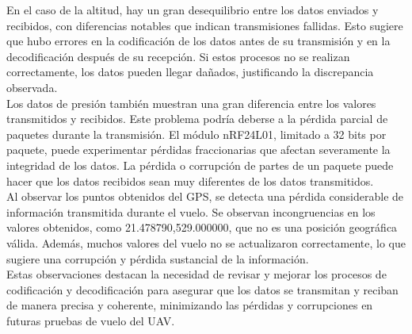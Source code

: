 En el caso de la altitud, hay un gran desequilibrio entre los datos enviados y recibidos, con diferencias notables que indican transmisiones fallidas. Esto sugiere que hubo errores en la codificación de los datos antes de su transmisión y en la decodificación después de su recepción. Si estos procesos no se realizan correctamente, los datos pueden llegar dañados, justificando la discrepancia observada.\\

Los datos de presión también muestran una gran diferencia entre los valores transmitidos y recibidos. Este problema podría deberse a la pérdida parcial de paquetes durante la transmisión. El módulo nRF24L01, limitado a 32 bits por paquete, puede experimentar pérdidas fraccionarias que afectan severamente la integridad de los datos. La pérdida o corrupción de partes de un paquete puede hacer que los datos recibidos sean muy diferentes de los datos transmitidos.\\

Al observar los puntos obtenidos del GPS, se detecta una pérdida considerable de información transmitida durante el vuelo. Se observan incongruencias en los valores obtenidos, como 21.478790,529.000000, que no es una posición geográfica válida. Además, muchos valores del vuelo no se actualizaron correctamente, lo que sugiere una corrupción y pérdida sustancial de la información.\\

Estas observaciones destacan la necesidad de revisar y mejorar los procesos de codificación y decodificación para asegurar que los datos se transmitan y reciban de manera precisa y coherente, minimizando las pérdidas y corrupciones en futuras pruebas de vuelo del UAV.



